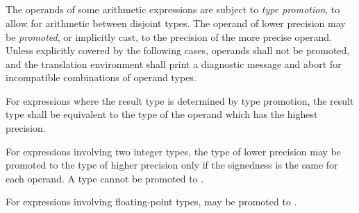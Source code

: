 \begin{grammar}
 \\
	 \\
	 \\
	 \\
	 \\
	 \\
	 \\
	 \\
	 \\
	 \\

 \\
	\terminal{\{}  \terminal{\}} \\
	\terminal{\{}  \terminal{;} \terminal{\}} \\
	\terminal{\{}  \terminal{;}  \terminal{;} \terminal{\}} \\
\end{grammar}


\specsubitem
The operands of some arithmetic expressions are subject to \textit{type
promotion}, to allow for arithmetic between disjoint types. The operand of
lower precision may be \textit{promoted}, or implicitly cast, to the precision
of the more precise operand. Unless explicitly covered by the following cases,
operands shall not be promoted, and the translation environment shall print a
diagnostic message and abort for incompatible combinations of operand types.

\specsubitem
For expressions where the result type is determined by type promotion, the
result type shall be equivalent to the type of the operand which has the
highest precision.

\specsubitem
For expressions involving two integer types, the type of lower precision may be
promoted to the type of higher precision only if the signedness is the same for
each operand. A type cannot be promoted to .

\specsubitem
For expressions involving floating-point types,  may be promoted
to .

